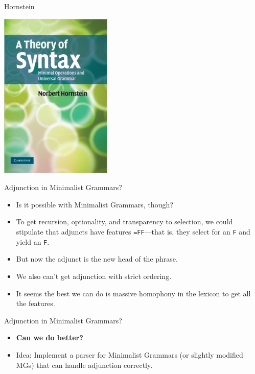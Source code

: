 \documentclass{beamer}
\begin{document}
\begin{frame}{Hornstein}
  \begin{center}
    \includegraphics[width=0.4\textwidth]{theory-of-syntax}
  \end{center}
\end{frame}

\begin{frame}{Adjunction in Minimalist Grammars?}
  \begin{itemize}
  \item Is it possible with Minimalist Grammars, though? \pause
  \item To get recursion, optionality, and transparency to selection,
    we could stipulate that adjuncts have features \texttt{=FF}---that
    is, they select for an \texttt{F} and yield an \texttt{F}.
  \item But now the adjunct is the new head of the phrase.
  \item We also can't get adjunction with strict ordering.
  \item It seems the best we can do is massive homophony in the
    lexicon to get all the features.
  \end{itemize}
\end{frame}

\begin{frame}{Adjunction in Minimalist Grammars?}
  \begin{itemize}
  \item \textbf{Can we do better?}
  \item Idea: Implement a parser for Minimalist Grammars (or slightly
    modified MGs) that can handle adjunction correctly.
  \end{itemize}
\end{frame}
\end{document}
